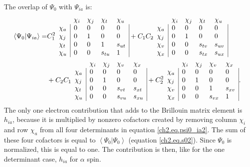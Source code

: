 The overlap of $\Psi_0$ with $\Psi_{ia}$ is:
\begin{equation}
\begin{split}
\left<\Psi_0|\Psi_{ia} \right> =& C_1^2
\begin{array}{lllll}
 &  \chi_i & \chi_j & \chi_t & \chi_u \\
 \chi_a & \multicolumn{1}{|l}{ 0 } & 0 & 0 & \multicolumn{1}{l|}{ 0 } \\
 \chi_j & \multicolumn{1}{|l}{ 0 } & 1 & 0 & \multicolumn{1}{l|}{ 0 } \\
 \chi_t & \multicolumn{1}{|l}{ 0 } & 0 & 1 & \multicolumn{1}{l|}{s_{ut}} \\
 \chi_u & \multicolumn{1}{|l}{ 0 } & 0 & s_{tu} & \multicolumn{1}{l|}{1}
\end{array}+ C_1 C_2
\begin{array}{lllll}
 &  \chi_i & \chi_j & \chi_t & \chi_u \\
 \chi_a & \multicolumn{1}{|l}{ 0 } & 0 & 0 & \multicolumn{1}{l|}{ 0 } \\
 \chi_j & \multicolumn{1}{|l}{ 0 } & 1 & 0 & \multicolumn{1}{l|}{ 0 } \\
 \chi_v & \multicolumn{1}{|l}{ 0 } & 0 & s_{tv} & \multicolumn{1}{l|}{s_{uv}} \\
 \chi_x & \multicolumn{1}{|l}{ 0 } & 0 & s_{tx} & \multicolumn{1}{l|}{s_{ux}}
\end{array} \\
& + C_2 C_1 \begin{array}{lllll}
 &  \chi_i & \chi_j & \chi_v & \chi_x \\
 \chi_a & \multicolumn{1}{|l}{ 0 } & 0 & 0 & \multicolumn{1}{l|}{ 0 } \\
 \chi_j & \multicolumn{1}{|l}{ 0 } & 1 & 0 & \multicolumn{1}{l|}{ 0 } \\
 \chi_t & \multicolumn{1}{|l}{ 0 } & 0 & s_{vt} & \multicolumn{1}{l|}{s_{xt}} \\
 \chi_u & \multicolumn{1}{|l}{ 0 } & 0 & s_{vu} & \multicolumn{1}{l|}{s_{xu}}
\end{array}+ C_2^2
\begin{array}{lllll}
 &  \chi_i & \chi_j & \chi_v & \chi_x \\
 \chi_a & \multicolumn{1}{|l}{ 0 } & 0 & 0 & \multicolumn{1}{l|}{ 0 } \\
 \chi_j & \multicolumn{1}{|l}{ 0 } & 1 & 0 & \multicolumn{1}{l|}{ 0 } \\
 \chi_v & \multicolumn{1}{|l}{ 0 } & 0 & 1 & \multicolumn{1}{l|}{s_{xv}} \\
 \chi_x & \multicolumn{1}{|l}{ 0 } & 0 & s_{vx} & \multicolumn{1}{l|}{ 1 }
\end{array}.
\end{split}
\label{ch2.eq.psi0_ia2}
\end{equation}
The only one electron contribution that adds to the Brillouin matrix element is $h_{ia}$, because it is multiplied by nonzero  cofactors created by removing column $\chi_i$ and row $\chi_a$ from all four determinants in equation \ref{ch2.eq.psi0_ia2}. The sum of these four cofactors is equal to $\left< \Psi_0 | \Psi_0 \right>$ (equation \ref{ch2.eq.s02}). Since $\Psi_0$ is normalized, this is equal to one. The contribution is then, like for the one determinant case, $h_{ia}$ for $\alpha$ spin.

